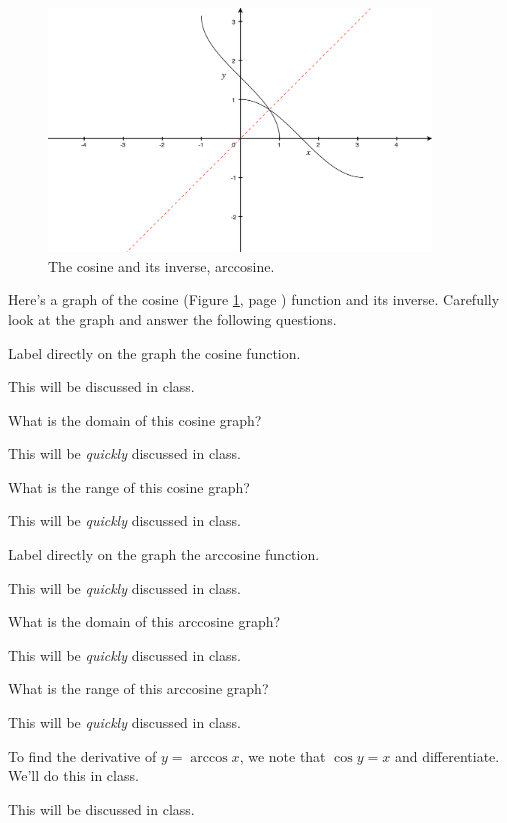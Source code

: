 \documentclass[12pt,addpoints, answers, fleqn]{exam}
\begin{document}
\begin{figure}[htbp] %
   \centering
   \includegraphics[width=4in]{./graphics/graph1603.pdf} 
   \caption{The cosine and its inverse, arccosine.}
   \label{fig:graph1603}
\end{figure}
Here's a graph of the cosine (Figure \ref{fig:graph1603}, page \pageref{fig:graph1603}) function and its inverse. Carefully look at the graph and answer the following questions.
\begin{questions}
\question Label directly on the graph the cosine function.

\begin{solution}
This will be discussed in class.
\end{solution}

\question What is the domain of this cosine graph?

\begin{solution}
This will be \emph{quickly} discussed in class.
\end{solution}

\question What is the range of this cosine graph?

\begin{solution}
This will be \emph{quickly} discussed in class.
\end{solution}

\question Label directly on the graph the arccosine function.

\begin{solution}
This will be \emph{quickly} discussed in class.
\end{solution}

\question What is the domain of this arccosine graph?
\begin{solution}
This will be \emph{quickly} discussed in class.
\end{solution}


\question What is the range of this arccosine graph?

\begin{solution}
This will be \emph{quickly} discussed in class.
\end{solution}

\question To find the derivative of $y = \arccos x$, we note that $\cos y = x$ and differentiate. We'll do this in class.

\begin{solution}
This will be discussed in class.
\end{solution}

\end{questions}
\end{document}
